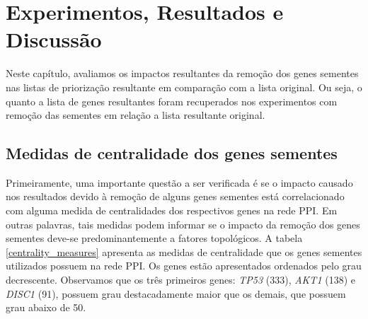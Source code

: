 \chapter[Experimentos, Resultados e Discussão]{Experimentos, Resultados e Discussão}

%
%
%
%
%

Neste capítulo, avaliamos os impactos resultantes da remoção dos genes sementes nas listas de priorização resultante em comparação com a lista original. 
%
Ou seja, o quanto a lista de genes resultantes foram recuperados nos experimentos com remoção das sementes em relação a lista resultante original.



%
%

\section{Medidas de centralidade dos genes sementes}

Primeiramente, uma importante questão a ser verificada é se o impacto causado nos resultados devido à remoção de alguns genes sementes está correlacionado com alguma medida de centralidades dos respectivos genes na rede PPI.
Em outras palavras, tais medidas podem informar se o impacto da remoção dos genes sementes deve-se predominantemente a fatores topológicos.
%
A tabela \ref{centrality_measures} apresenta as medidas de centralidade que os genes sementes utilizados possuem na rede PPI.
Os genes estão apresentados ordenados pelo grau decrescente.
Observamos que os três primeiros genes: \textsl{TP53} (333), \textsl{AKT1} (138) e \textsl{DISC1} (91), possuem grau destacadamente maior que os demais, que possuem grau abaixo de 50.

